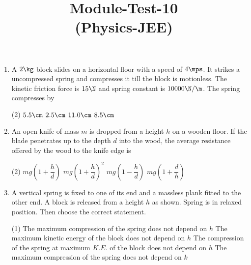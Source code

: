 \documentclass{article}
\title{Module-Test-10\\(Physics-JEE)}
\begin{document}
\maketitle

\jeeSectionA
\begin{enumerate}
\item A $2 \kg$ block slides on a horizontal floor with a speed of $4 \mps$. It strikes a uncompressed spring and compresses it till the block is motionless. The kinetic friction force is $15 \N$ and spring constant is $10000 \N/\m$. The spring compresses by
\begin{center}
\end{center}
\begin{tasks}(2)
	\task $5.5\cm$ \ans
	\task $2.5\cm$ 
	\task $11.0\cm$
	\task $8.5\cm$
\end{tasks}

\item An open knife of mass $m$ is dropped from a height $h$ on a wooden floor. If the blade penetrates up to the depth $d$ into the wood, the average resistance offered by the wood to the knife edge is
\begin{tasks}(2)
	\task $mg\left( 1+\dfrac{h}{d} \right)$\ans
	\task $mg\left( 1+\dfrac{h}{d} \right)^2$
	\task $mg\left( 1-\dfrac{h}{d} \right)$
	\task $mg\left( 1+\dfrac{d}{h} \right)$
\end{tasks}

\item A vertical spring is fixed to one of its end and a massless plank fitted to the other end.
A block is released from a height $h$ as shown. Spring is in relaxed position. Then choose the correct statement.
\begin{center}
\end{center}
\begin{tasks}(1)
	\task The maximum compression of the spring does not depend on $h$
	\task The maximum kinetic energy of the block does not depend on $h$
	\task The compression of the spring at maximum $K.E.$ of the block does not depend on $h$\ans
	\task The maximum compression of the spring does not depend on $k$
\end{tasks}


\end{enumerate}
\end{document}
